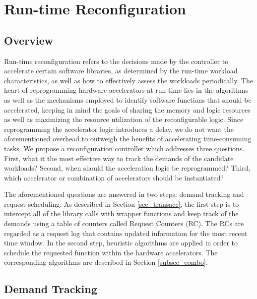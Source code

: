 \section{Run-time Reconfiguration }
\label{sec_runtime_reconfig}

\subsection{Overview}
\label{subsec_runtime_reconfig_overview}

Run-time reconfiguration refers to the decisions made by the controller
to accelerate certain software libraries, 
as determined by the run-time workload characteristics, as well as how to effectively assess the
workloads periodically. The heart of reprogramming hardware
accelerators at run-time lies in the algorithms as well as the mechanisms employed to
identify software functions that should be accelerated, keeping in mind the goals of sharing
the memory and logic resources as well as maximizing the resource utilization of the
reconfigurable logic. Since reprogramming the accelerator logic 
introduces a delay, we do not want the aforementioned overhead to outweigh the benefits of accelerating time-consuming
tasks. We propose a reconfiguration controller which addresses three
questions.
First, what it the most effective way to track the demands of the candidate workloads? 
Second, when should the acceleration logic be reprogrammed?
Third, which accelerator or combination of accelerators should be instantiated?


The aforementioned questions are answered in two steps:
demand tracking and request scheduling. As described in
Section \ref{sec_transacc}, the first step is to intercept all of the
library calls with wrapper functions and keep track of the demands
using a table of counters called Request Counters (RC). The RCs
are regarded as a request log that contains updated information for the most
recent time window. In the second step, heuristic algorithms are applied in order to
schedule the requested function within the hardware accelerators. 
The corresponding algorithms are described in Section \ref{subsec_combo}. 

\subsection{Demand Tracking} 

